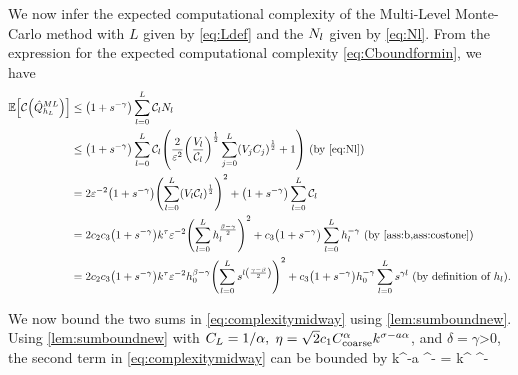We now infer the expected computational complexity of the Multi-Level Monte-Carlo method with $L$ given by \eqref{eq:Ldef} and the $N_{l}$ given by \eqref{eq:Nl}. From the expression for the expected computational complexity \cref{eq:Cboundformin}, we have
\begin{align}
\EXP{\Cost{\QhatMLhL}} &\leq \mleft(1+s^{-\gamma}\mright)\sum_{l=0}^{L} \Cl \Nl\nonumber\\
&\leq \mleft(1+s^{-\gamma}\mright)\sum_{l=0}^L \Cl \mleft(\frac2{\eps^{2}} \mleft(\frac{\Vl}{\Cl}\mright)^{\half}\sum_{j=0}^L \mleft(\Vj\Cj\mright)^{\half} + 1\mright) \text{ (by \eqref{eq:Nl})}\nonumber\\
&= 2\eps^{-2}\mleft(1+s^{-\gamma}\mright)\mleft(\sum_{l=0}^L\mleft(\Vl\Cl\mright)^{\half}\mright)^2 + \mleft(1+s^{-\gamma}\mright)\sum_{l=0}^L \Cl\nonumber\\
&= 2 \ct \cth \mleft(1+s^{-\gamma}\mright)k^{\tau}\eps^{-2} \mleft(\sum_{l=0}^L \hl^{\frac{\beta-\gamma}2}\mright)^2 + \cth \mleft(1+s^{-\gamma}\mright) \sum_{l=0}^L \hl^{-\gamma} \text{ (by \cref{ass:b,ass:costone})}\nonumber\\
&= 2 \ct\cth \mleft(1+s^{-\gamma}\mright)k^{\tau}\eps^{-2}\hz^{\beta-\gamma}\mleft(\sum_{l=0}^L s^{l\mleft(\frac{\gamma-\beta}2\mright)}\mright)^2 + \cth\mleft(1+s^{-\gamma}\mright) \hz^{-\gamma} \sum_{l=0}^L s^{\gamma l} \text{ (by definition of } \hl\text{).}\label{eq:complexitymidway}
\end{align}

We now bound the two sums in \cref{eq:complexitymidway} using \cref{lem:sumboundnew}. Using \cref{lem:sumboundnew} with $C_{L} = 1/\alpha,$ $\eta = \sqrt{2}c_{1}C_{\mathrm{coarse}}^\alpha k^{\sigma - a\alpha}$, and $\delta = \gamma$>0, the second term in \eqref{eq:complexitymidway} can be bounded by %
\beq\label{eq:firstterm}
\cth{} k^{\frac{\gamma\sigma}\alpha-a\gamma} \eps^{-\frac\gamma\alpha}
=  k^{\frac{\gamma\sigma}\alpha} \eps^{-\frac\gamma\alpha}
\eeq

